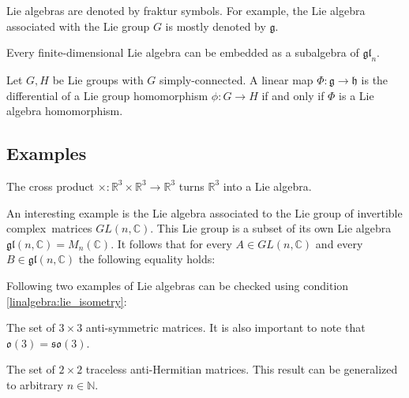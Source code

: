         \begin{notation}
        	Lie algebras are denoted by fraktur symbols. For example, the Lie algebra associated with the Lie group $G$ is mostly denoted by $\mathfrak{g}$.
        \end{notation}
        
	\begin{theorem}
		Every finite-dimensional Lie algebra can be embedded as a subalgebra of $\mathfrak{gl}_n$.
	\end{theorem}
	
	\begin{property}
		\label{lie:prop_hom}
		Let $G, H$ be Lie groups with $G$ simply-connected. A linear map $\Phi:\mathfrak{g}\rightarrow\mathfrak{h}$ is the differential of a Lie group homomorphism $\phi:G\rightarrow H$ if and only if $\Phi$ is a Lie algebra homomorphism.
	\end{property}

\subsection{Examples}
        \begin{example}
        	The cross product $\times:\mathbb{R}^3\times\mathbb{R}^3\rightarrow\mathbb{R}^3$ turns $\mathbb{R}^3$ into a Lie algebra.
        \end{example}
        \begin{example}
        	An interesting example is the Lie algebra associated to the Lie group of invertible complex\footnotemark\ matrices $GL(n, \mathbb{C})$. This Lie group is a subset of its own Lie algebra $\mathfrak{gl}(n, \mathbb{C}) = M_n(\mathbb{C})$. It follows that for every $A\in GL(n, \mathbb{C})$ and every $B\in\mathfrak{gl}(n, \mathbb{C})$ the following equality holds:
        \end{example}
        
        Following two examples of Lie algebras can be checked using condition \ref{linalgebra:lie_isometry}:
        \begin{example}
        	The set of $3\times3$ anti-symmetric matrices. It is also important to note that $\mathfrak{o}(3) = \mathfrak{so}(3)$.
        \end{example}
        \begin{example}
        	The set of $2\times2$ traceless anti-Hermitian matrices. This result can be generalized to arbitrary $n\in\mathbb{N}$.
        \end{example}

